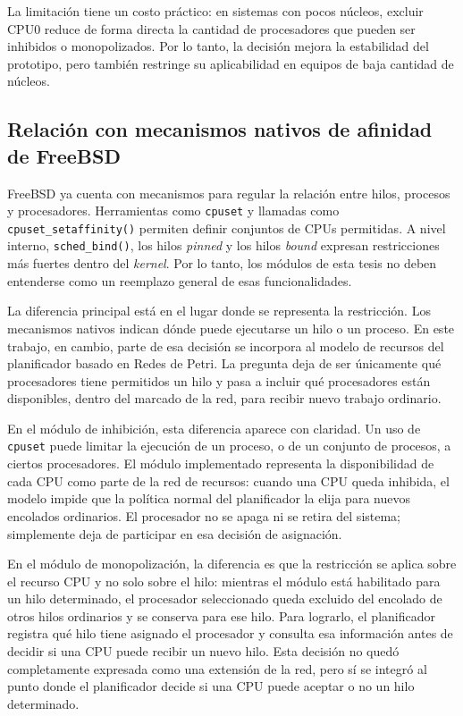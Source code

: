 La limitación tiene un costo práctico: en sistemas con pocos núcleos, excluir CPU0 reduce de forma directa la cantidad de procesadores que pueden ser inhibidos o monopolizados. Por lo tanto, la decisión mejora la estabilidad del prototipo, pero también restringe su aplicabilidad en equipos de baja cantidad de núcleos.\par

\subsection{Relación con mecanismos nativos de afinidad de FreeBSD}\label{sect:afinidad-freebsd-modulos}

FreeBSD ya cuenta con mecanismos para regular la relación entre hilos, procesos y procesadores. Herramientas como \verb|cpuset| y llamadas como \verb|cpuset_setaffinity()| permiten definir conjuntos de CPUs permitidas. A nivel interno, \verb|sched_bind()|, los hilos \textit{pinned} y los hilos \textit{bound} expresan restricciones más fuertes dentro del \textit{kernel}. Por lo tanto, los módulos de esta tesis no deben entenderse como un reemplazo general de esas funcionalidades.\par

La diferencia principal está en el lugar donde se representa la restricción. Los mecanismos nativos indican dónde puede ejecutarse un hilo o un proceso. En este trabajo, en cambio, parte de esa decisión se incorpora al modelo de recursos del planificador basado en Redes de Petri. La pregunta deja de ser únicamente qué procesadores tiene permitidos un hilo y pasa a incluir qué procesadores están disponibles, dentro del marcado de la red, para recibir nuevo trabajo ordinario.\par

En el módulo de inhibición, esta diferencia aparece con claridad. Un uso de \verb|cpuset| puede limitar la ejecución de un proceso, o de un conjunto de procesos, a ciertos procesadores. El módulo implementado representa la disponibilidad de cada CPU como parte de la red de recursos: cuando una CPU queda inhibida, el modelo impide que la política normal del planificador la elija para nuevos encolados ordinarios. El procesador no se apaga ni se retira del sistema; simplemente deja de participar en esa decisión de asignación.\par

En el módulo de monopolización, la diferencia es que la restricción se aplica sobre el recurso CPU y no solo sobre el hilo: mientras el módulo está habilitado para un hilo determinado, el procesador seleccionado queda excluido del encolado de otros hilos ordinarios y se conserva para ese hilo. Para lograrlo, el planificador registra qué hilo tiene asignado el procesador y consulta esa información antes de decidir si una CPU puede recibir un nuevo hilo. Esta decisión no quedó completamente expresada como una extensión de la red, pero sí se integró al punto donde el planificador decide si una CPU puede aceptar o no un hilo determinado.\par

